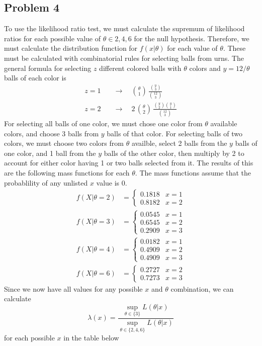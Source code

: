 \documentclass{article}
\begin{document}
\subsection*{Problem 4}
To use the likelihood ratio test, we must calculate the supremum of likelihood ratios for each possible value of $\theta \in {2,4,6}$ for the null hypothesis. Therefore, we must calculate the distribution function for $f(x|\theta)$ for each value of $\theta$. These must be calculated with combinatorial rules for selecting balls from urns. The general formula for selecting $z$ different colored balls with $\theta$ colors and $y = 12/\theta$ balls of each color is
\begin{align*}
z = 1 \quad &\rightarrow \quad\binom{\theta}{1}\,\frac{\binom{y}{3}}{\binom{12}{3}} \\ 
z = 2 \quad &\rightarrow \quad2\,\binom{\theta}{2}\,\frac{\binom{y}{2}\binom{y}{1}}{\binom{12}{3}}
\end{align*}
For selecting all balls of one color, we must chose one color from $\theta$ available colors, and choose 3 balls from $y$ balls of that color. For selecting balls of two colors, we must choose two colors from $\theta$ availble, select 2 balls from the $y$ balls of one color, and 1 ball from the $y$ balls of the other color, then multiply by 2 to account for either color having 1 or two balls selected from it. The results of this are the following mass functions for each $\theta$. The mass functions assume that the probablility of any unlisted $x$ value is 0.
\begin{align*}
f(X|\theta=2) &= \begin{cases}0.1818 & x=1\\0.8182 & x=2 \end{cases} \\ 
f(X|\theta=3) &= \begin{cases}0.0545 & x=1 \\0.6545 & x=2 \\ 0.2909 & x=3 \end{cases} \\
f(X|\theta=4) &= \begin{cases}0.0182 & x=1 \\0.4909 & x=2 \\ 0.4909 & x=3 \end{cases} \\
f(X|\theta=6) &= \begin{cases}0.2727 & x=2 \\ 0.7273 & x=3 \end{cases} 
\end{align*}
Since we now have all values for any possible $x$ and $\theta$ combination, we can calculate 
\[\lambda(x) = \frac{\sup\limits_{\theta\in\{3\}}L(\theta|x)}{\sup\limits_{\theta\in\{2,4,6\}}L(\theta|x)}\]
for each possible $x$ in the table below
\end{document}
